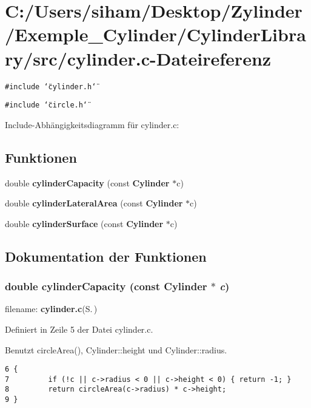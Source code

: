\section{C:/Users/siham/Desktop/Zylinder/Exemple\_\-Cylinder/Cylinder\-Library/src/cylinder.c-Dateireferenz}
\label{cylinder_8c}
{\tt \#include \char`\"{}cylinder.h\char`\"{}}\par
{\tt \#include \char`\"{}circle.h\char`\"{}}\par


Include-Abh\"{a}ngigkeitsdiagramm f\"{u}r cylinder.c:\subsection*{Funktionen}
\begin{CompactItemize}
\item 
double {\bf cylinder\-Capacity} (const {\bf Cylinder} $\ast$c)
\item 
double {\bf cylinder\-Lateral\-Area} (const {\bf Cylinder} $\ast$c)
\item 
double {\bf cylinder\-Surface} (const {\bf Cylinder} $\ast$c)
\end{CompactItemize}


\subsection{Dokumentation der Funktionen}
\subsubsection{\setlength{\rightskip}{0pt plus 5cm}double cylinder\-Capacity (const {\bf Cylinder} $\ast$ {\em c})}\label{cylinder_8c_c35ebde26ddb19866e3f1259e304cca8}


filename: {\bf cylinder.c}{\rm (S.\,\pageref{cylinder_8c})} 

Definiert in Zeile 5 der Datei cylinder.c.

Benutzt circle\-Area(), Cylinder::height und Cylinder::radius.

\footnotesize\begin{verbatim}6 {
7         if (!c || c->radius < 0 || c->height < 0) { return -1; }
8         return circleArea(c->radius) * c->height;
9 }
\end{verbatim}\normalsize 




